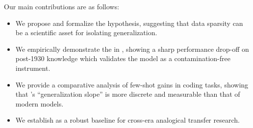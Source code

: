 Our main contributions are as follows:
\begin{itemize}[leftmargin=*,itemsep=0pt,topsep=0pt]
    \item We propose and formalize the \hypo hypothesis, suggesting that data sparsity can be a scientific asset for isolating generalization.
    \item We empirically demonstrate the \cliff in \talkie, showing a sharp performance drop-off on post-1930 knowledge which validates the model as a contamination-free instrument.
    \item We provide a comparative analysis of few-shot gains in coding tasks, showing that \talkie's ``generalization slope'' is more discrete and measurable than that of modern models.
    \item We establish \talkie as a robust baseline for cross-era analogical transfer research.
\end{itemize}
